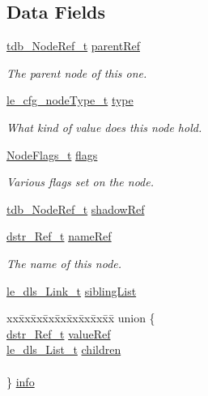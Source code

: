 \subsection*{Data Fields}
\begin{DoxyCompactItemize}
\item 
\hyperlink{tree_db_8h_a4c1f526addd1a1042694efa439a97801}{tdb\+\_\+\+Node\+Ref\+\_\+t} \hyperlink{struct_node__t_ac48f1b18479a2a96c50a9e9828449134}{parent\+Ref}
\begin{DoxyCompactList}\small\item\em The parent node of this one. \end{DoxyCompactList}\item 
\hyperlink{le__cfg__interface_8h_a29c8480b3310d1235487d7ea96d8b57d}{le\+\_\+cfg\+\_\+node\+Type\+\_\+t} \hyperlink{struct_node__t_ad9bf3285198ae587caf0fd3922420d35}{type}
\begin{DoxyCompactList}\small\item\em What kind of value does this node hold. \end{DoxyCompactList}\item 
\hyperlink{tree_db_8c_ab361d964c747f936e1145315ca16ea47}{Node\+Flags\+\_\+t} \hyperlink{struct_node__t_a53b71bbcaeea959963146a4150dc42e3}{flags}
\begin{DoxyCompactList}\small\item\em Various flags set on the node. \end{DoxyCompactList}\item 
\hyperlink{tree_db_8h_a4c1f526addd1a1042694efa439a97801}{tdb\+\_\+\+Node\+Ref\+\_\+t} \hyperlink{struct_node__t_a11cafd8692148f205dce7bcfb8487ea5}{shadow\+Ref}
\item 
\hyperlink{dynamic_string_8h_ab7a26f3143e237aac1798042083fbd7e}{dstr\+\_\+\+Ref\+\_\+t} \hyperlink{struct_node__t_adf247b01137fd2743c4390e9898e37bd}{name\+Ref}
\begin{DoxyCompactList}\small\item\em The name of this node. \end{DoxyCompactList}\item 
\hyperlink{structle__dls___link__t}{le\+\_\+dls\+\_\+\+Link\+\_\+t} \hyperlink{struct_node__t_a04c6c16e4fe15f101ab177f459163957}{sibling\+List}
\item 
\begin{tabbing}
xx\=xx\=xx\=xx\=xx\=xx\=xx\=xx\=xx\=\kill
union \{\\
\>\hyperlink{dynamic_string_8h_ab7a26f3143e237aac1798042083fbd7e}{dstr\_Ref\_t} \hyperlink{struct_node__t_a6d03e74388f5585c697f142a1bcdf2d2}{valueRef}\\
\>\hyperlink{structle__dls___list__t}{le\_dls\_List\_t} \hyperlink{struct_node__t_a6cf3b7ad27e888d73383d3a75f8684c1}{children}\\
\>\\
\} \hyperlink{struct_node__t_af6bb9c6789c0c8c94450df6ef4704070}{info}\\


\end{tabbing}
\end{DoxyCompactItemize}

